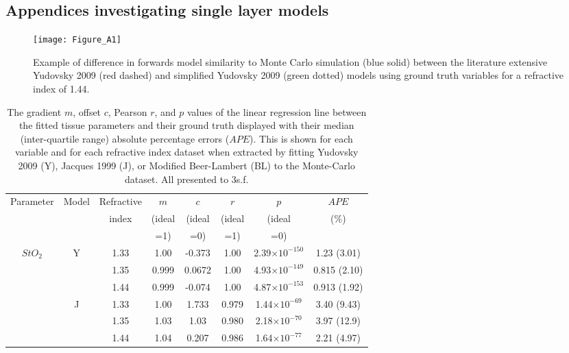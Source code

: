 % 
\clearpage
\begin{subappendices}
    \section{Appendices investigating single layer models}
\begin{figure}[htb!]
    \centering
    \texttt{[image: Figure\_A1]}
    \caption{Example of difference in forwards model similarity to Monte Carlo simulation (blue solid) between the literature extensive Yudovsky 2009 (red dashed) and simplified Yudovsky 2009 (green dotted) models using ground truth variables for a refractive index of 1.44.}
 \label{fig:badYudovsky}
\end{figure}

\begin{table}[htb!]
    \centering
    \caption{The gradient $m$, offset $c$, Pearson $r$, and $p$ values of the linear regression line between the fitted tissue parameters and their ground truth displayed with their median (inter-quartile range) absolute percentage errors ($APE$). This is shown for each variable and for each refractive index dataset when extracted by fitting Yudovsky 2009 (Y), Jacques 1999 (J), or Modified Beer-Lambert (BL) to the Monte-Carlo dataset. All presented to 3s.f.}
    \begin{tabular}{|ccc|ccccc|}
        \hline
        Parameter & Model & Refractive & $m$ & $c$ & $r$ & $p$ & $APE$ \\
        & & index & (ideal & (ideal & (ideal & (ideal & (\%)\\
        & & & =1) & =0) & =1) & =0) & \\
        \hline
        \multirow{9}{*}{$StO_2$} & \multirow{3}{*}{Y} & 1.33 & 1.00 & -0.373 & 1.00 & 2.39$\times 10^{-150}$ & 1.23 (3.01) \\
        & & 1.35 & 0.999 & 0.0672 & 1.00 & 4.93$\times 10^{-149}$ & 0.815 (2.10) \\
        & & 1.44 & 0.999 & -0.074 & 1.00 & 4.87$\times 10^{-153}$ & 0.913 (1.92) \\
        \cline{2-8}
        & \multirow{3}{*}{J} & 1.33 & 1.00 & 1.733 & 0.979 & 1.44$\times 10^{-69}$ & 3.40 (9.43) \\
        & & 1.35 & 1.03 & 1.03 & 0.980 & 2.18$\times 10^{-70}$ & 3.97 (12.9) \\
        & & 1.44 &  1.04 & 0.207 & 0.986 & 1.64$\times 10^{-77}$ & 2.21 (4.97) \\

\end{tabular}
\end{table}
\end{subappendices}
